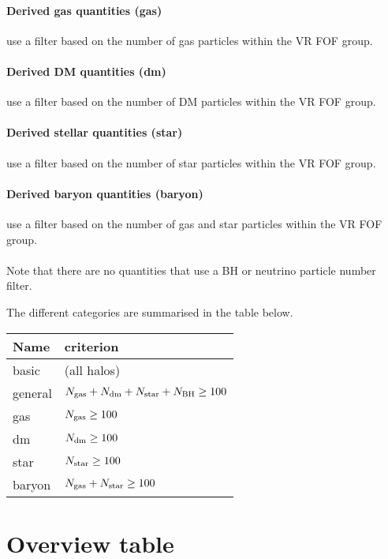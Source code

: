 \documentclass{article}
\begin{document}
\paragraph{Derived gas quantities (gas)} use a filter based on the number of gas particles within the VR FOF 
group.

\paragraph{Derived DM quantities (dm)} use a filter based on the number of DM particles within the VR FOF 
group.

\paragraph{Derived stellar quantities (star)} use a filter based on the number of star particles within the VR 
FOF group.

\paragraph{Derived baryon quantities (baryon)} use a filter based on the number of gas and star particles 
within the VR FOF group.

\paragraph{}Note that there are no quantities that use a BH or neutrino particle number filter.

The different categories are summarised in the table below.

\begin{longtable}{ll}
Name & criterion \\
\hline{}basic & (all halos) \\
general & $N_{\rm{}gas}+N_{\rm{}dm}+N_{\rm{}star}+N_{\rm{}BH} \geq{} 100$ \\
gas & $N_{\rm{}gas} \geq{} 100$ \\
dm & $N_{\rm{}dm} \geq{} 100$ \\
star & $N_{\rm{}star} \geq{} 100$ \\
baryon & $N_{\rm{}gas}+N_{\rm{}star} \geq{} 100$ \\
\end{longtable}

\section{Overview table}
\end{document}
